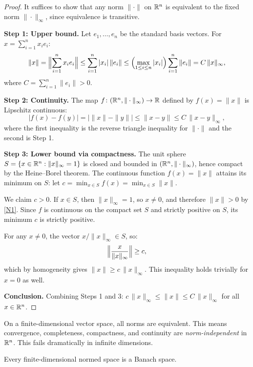 \documentclass[11pt,a4paper]{article}
\begin{document}
\begin{proof}
It suffices to show that any norm $\|\cdot\|$ on $\mathbb{R}^n$ is equivalent to the
fixed norm $\|\cdot\|_\infty$, since equivalence is transitive.

\textbf{Step 1: Upper bound.} Let $e_1, \ldots, e_n$ be the standard basis
vectors. For $x = \sum_{i=1}^n x_i e_i$:
\[
\|x\| = \Bigl\|\sum_{i=1}^n x_i e_i\Bigr\|
\le \sum_{i=1}^n |x_i| \, \|e_i\|
\le \Bigl(\max_{1 \le i \le n} |x_i|\Bigr) \sum_{i=1}^n \|e_i\|
= C \, \|x\|_\infty,
\]
where $C = \sum_{i=1}^n \|e_i\| > 0$.

\textbf{Step 2: Continuity.} The map $f \colon (\mathbb{R}^n, \|\cdot\|_\infty)
\to \mathbb{R}$ defined by $f(x) = \|x\|$ is Lipschitz continuous:
\[
|f(x) - f(y)| = \bigl| \|x\| - \|y\| \bigr| \le \|x - y\| \le C \,
\|x - y\|_\infty,
\]
where the first inequality is the reverse triangle inequality for $\|\cdot\|$
and the second is Step 1.

\textbf{Step 3: Lower bound via compactness.} The unit sphere
$S = \{x \in \mathbb{R}^n : \|x\|_\infty = 1\}$ is closed and bounded in
$(\mathbb{R}^n, \|\cdot\|_\infty)$, hence compact by the Heine--Borel theorem. The
continuous function $f(x) = \|x\|$ attains its minimum on $S$: let
$c = \min_{x \in S} f(x) = \min_{x \in S} \|x\|$.

We claim $c > 0$. If $x \in S$, then $\|x\|_\infty = 1$, so $x \ne 0$,
and therefore $\|x\| > 0$ by \ref{N1}. Since $f$ is continuous on the compact
set $S$ and strictly positive on $S$, its minimum $c$ is strictly positive.

For any $x \ne 0$, the vector $x / \|x\|_\infty \in S$, so:
\[
\Bigl\|\frac{x}{\|x\|_\infty}\Bigr\| \ge c,
\]
which by homogeneity gives $\|x\| \ge c \, \|x\|_\infty$. This inequality
holds trivially for $x = 0$ as well.

\textbf{Conclusion.} Combining Steps 1 and 3:
$c \, \|x\|_\infty \le \|x\| \le C \, \|x\|_\infty$ for all $x \in \mathbb{R}^n$.
\end{proof}

\begin{keyresult}[title={Finite-Dimensional Norm Equivalence}]
On a finite-dimensional vector space, all norms are equivalent. This means
convergence, completeness, compactness, and continuity are
\emph{norm-independent} in $\mathbb{R}^n$. This fails dramatically in infinite
dimensions.
\end{keyresult}

\begin{corollary}
\label{cor:finite_dim_complete}
Every finite-dimensional normed space is a Banach space.
\end{corollary}
\end{document}
